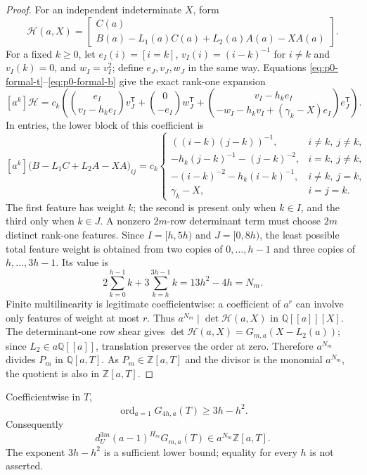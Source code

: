 \begin{proof}
For an independent indeterminate $X$, form
\[
 \mathcal H(a,X)=
 \begin{bmatrix}
 C(a)\\ B(a)-L_1(a)C(a)+L_2(a)A(a)-XA(a)
 \end{bmatrix}.
\]
For a fixed $k\ge0$, let $e_I(i)=[i=k]$,
$v_I(i)=(i-k)^{-1}$ for $i\ne k$ and $v_I(k)=0$, and
$w_I=v_I^2$; define $e_J,v_J,w_J$ in the same way.  Equations
\eqref{eq:p0-formal-t}--\eqref{eq:p0-formal-b} give the exact rank-one
expansion
\begin{equation}\label{eq:p0-rank-one}
 [a^k]\mathcal H=c_k\left(
 \binom{e_I}{v_I-h_ke_I}v_J^{\mathsf T}
 +\binom{0}{-e_I}w_J^{\mathsf T}
 +\binom{v_I-h_ke_I}{-w_I-h_kv_I+(\gamma_k-X)e_I}e_J^{\mathsf T}
 \right).
\end{equation}
In entries, the lower block of this coefficient is
\[
 [a^k]\bigl(B-L_1C+L_2A-XA\bigr)_{ij}
 =c_k\begin{cases}
 ((i-k)(j-k))^{-1},&i\ne k,\ j\ne k,\\
 -h_k(j-k)^{-1}-(j-k)^{-2},&i=k,\ j\ne k,\\
 -(i-k)^{-2}-h_k(i-k)^{-1},&i\ne k,\ j=k,\\
 \gamma_k-X,&i=j=k.
 \end{cases}
\]
The first feature has weight $k$; the second is present only when $k\in I$,
and the third only when $k\in J$.  A nonzero $2m$-row determinant term must
choose $2m$ distinct rank-one features.  Since $I=[h,5h)$ and $J=[0,8h)$,
the least possible total feature weight is obtained from two copies of
$0,\ldots,h-1$ and three copies of $h,\ldots,3h-1$.  Its value is
\[
 2\sum_{k=0}^{h-1}k+3\sum_{k=h}^{3h-1}k=13h^2-4h=N_m.
\]
Finite multilinearity is legitimate coefficientwise: a coefficient of $a^r$
can involve only features of weight at most $r$.  Thus
$a^{N_m}\mid\det\mathcal H(a,X)$ in $\mathbb Q[[a]][X]$.  The determinant-one
row shear gives
$\det\mathcal H(a,X)=G_{m,a}(X-L_2(a))$; since $L_2\in a\mathbb Q[[a]]$,
translation preserves the order at zero.  Therefore $a^{N_m}$ divides
$P_m$ in $\mathbb Q[a,T]$.  As $P_m\in\mathbb Z[a,T]$ and the divisor is
the monomial $a^{N_m}$, the quotient is also in $\mathbb Z[a,T]$.
\end{proof}

\begin{lemma}\label{lem:p0-pole}
Coefficientwise in $T$,
\[
 \operatorname{ord}_{a=1}G_{4h,a}(T)\ge3h-h^2.
\]
Consequently
\begin{equation}\label{eq:p0-refined-divisor}
 d_U^{3m}(a-1)^{H_m}G_{m,a}(T)
       \in a^{N_m}\mathbb Z[a,T].
\end{equation}
The exponent $3h-h^2$ is a sufficient lower bound; equality for every $h$ is
not asserted.
\end{lemma}

